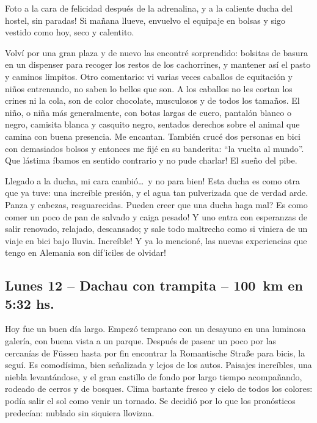 Foto a la cara de felicidad despu\'es de la adrenalina, \textexclamdown y a la
caliente ducha del hostel, sin paradas! Si ma\~nana llueve, envuelvo el equipaje
en bolsas y sigo vestido como hoy, seco y calentito.

Volv\'i por una gran plaza y de nuevo las encontr\'e sorprendido: bolsitas de
basura en un dispenser para recoger los restos de los cachorrines, y mantener
as\'i el pasto y caminos limpitos. Otro comentario: vi varias veces caballos
de equitaci\'on y ni\~nos entrenando, no saben lo bellos que son. A los
caballos no les cortan los crines ni la cola, son de color chocolate,
musculosos y de todos los tama\~nos. El ni\~no, o ni\~na m\'as generalmente,
con botas largas de cuero, pantal\'on blanco o negro, camisita blanca y
casquito negro, sentados derechos sobre el animal que camina con buena
presencia. Me encantan. Tambi\'en cruc\'e dos personas en bici con demasiados
bolsos y entonces me fij\'e en su banderita: ``la vuelta al mundo''.
\textexclamdown Que l\'astima \'ibamos en sentido contrario y no pude charlar!
El sue\~no del pibe.

Llegado a la ducha, mi cara cambi\'o\ldots\ \textexclamdown y no para bien! Esta
ducha es como otra que ya tuve: una incre\'ible presi\'on, y el agua tan
pulverizada que de verdad arde. Panza y cabezas, resguarecidas.
\textquestiondown Pueden creer que una ducha haga mal? \textexclamdown Es como
comer un poco de pan de salvado y caiga pesado! Y uno entra con esperanzas de
salir renovado, relajado, descansado; y sale todo maltrecho como si viniera de
un viaje en bici bajo lluvia. \textexclamdown Incre\'ible! Y ya lo mencion\'e,
\textexclamdown las nuevas experiencias que tengo en Alemania son dif'iciles de
olvidar!

\subsection*{Lunes 12 -- Dachau con trampita -- 100~km en 5:32 hs.}

Hoy fue un buen d\'ia largo. Empez\'o temprano con un desayuno en una luminosa
galer\'ia, con buena vista a un parque. Despu\'es de pasear un poco por las
cercan\'ias de F\"ussen hasta por fin encontrar la Romantische Stra\ss e para
bicis, la segu\'i. Es comod\'isima, bien se\~nalizada y lejos de los autos.
Paisajes incre\'ibles, una niebla levant\'andose, y el gran castillo de fondo
por largo tiempo acompa\~nando, rodeado de cerros y de bosques. Clima bastante
fresco y cielo de todos los colores: pod\'ia salir el sol como venir un
tornado. Se decidi\'o por lo que los pron\'osticos predec\'ian: nublado sin
siquiera llovizna.

